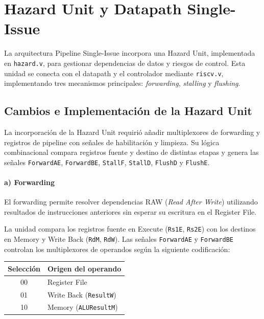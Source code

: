 \documentclass[12pt,a4paper]{article}
\begin{document}
\section{Hazard Unit y Datapath Single-Issue}

La arquitectura Pipeline Single-Issue incorpora una Hazard Unit, implementada en \texttt{hazard.v}, para gestionar dependencias de datos y riesgos de control. Esta unidad se conecta con el datapath y el controlador mediante \texttt{riscv.v}, implementando tres mecanismos principales: \textit{forwarding}, \textit{stalling} y \textit{flushing}.

\subsection{Cambios e Implementación de la Hazard Unit}

La incorporación de la Hazard Unit requirió añadir multiplexores de forwarding y registros de pipeline con señales de habilitación y limpieza. Su lógica combinacional compara registros fuente y destino de distintas etapas y genera las señales \texttt{ForwardAE}, \texttt{ForwardBE}, \texttt{StallF}, \texttt{StallD}, \texttt{FlushD} y \texttt{FlushE}.

\paragraph{a) Forwarding}

El forwarding permite resolver dependencias RAW (\textit{Read After Write}) utilizando resultados de instrucciones anteriores sin esperar su escritura en el Register File.

La unidad compara los registros fuente en Execute (\texttt{Rs1E}, \texttt{Rs2E}) con los destinos en Memory y Write Back (\texttt{RdM}, \texttt{RdW}). Las señales \texttt{ForwardAE} y \texttt{ForwardBE} controlan los multiplexores de operandos según la siguiente codificación:

\begin{center}
\begin{tabular}{|c|l|}
\hline
\textbf{Selección} & \textbf{Origen del operando} \\
\hline
00 & Register File \\
01 & Write Back (\texttt{ResultW}) \\
10 & Memory (\texttt{ALUResultM}) \\
\hline
\end{tabular}
\end{center}
\end{document}
